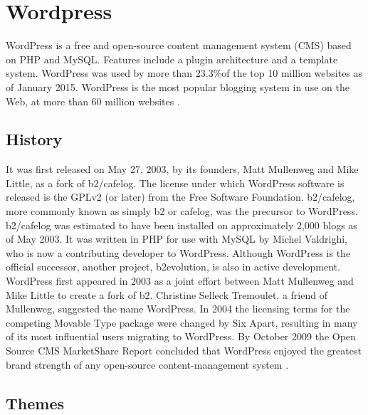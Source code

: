 \section{Wordpress}
\label{sec:CMS_wp}

WordPress is a free and open-source content management system (CMS) based on PHP and MySQL. \cite{cms_wp_over} Features include a plugin architecture and a template system. WordPress was used by more than 23.3\%of the top 10 million websites as of January 2015. WordPress is the most popular blogging system in use on the Web, at more than 60 million websites \cite{cms_wp_stats}.


\subsection{History}
\label{subsec:wp_his}
It was first released on May 27, 2003, by its founders, Matt Mullenweg and Mike Little, as a fork of b2/cafelog. The license under which WordPress software is released is the GPLv2 (or later) from the Free Software Foundation.
b2/cafelog, more commonly known as simply b2 or cafelog, was the precursor to WordPress. b2/cafelog was estimated to have been installed on approximately 2,000 blogs as of May 2003. It was written in PHP for use with MySQL by Michel Valdrighi, who is now a contributing developer to WordPress. Although WordPress is the official successor, another project, b2evolution, is also in active development.
WordPress first appeared in 2003 as a joint effort between Matt Mullenweg and Mike Little to create a fork of b2. Christine Selleck Tremoulet, a friend of Mullenweg, suggested the name WordPress.
In 2004 the licensing terms for the competing Movable Type package were changed by Six Apart, resulting in many of its most influential users migrating to WordPress. By October 2009 the Open Source CMS MarketShare Report concluded that WordPress enjoyed the greatest brand strength of any open-source content-management system \cite{cms_wp}. 



\subsection{Themes}
\label{subsec:wp_themes}


